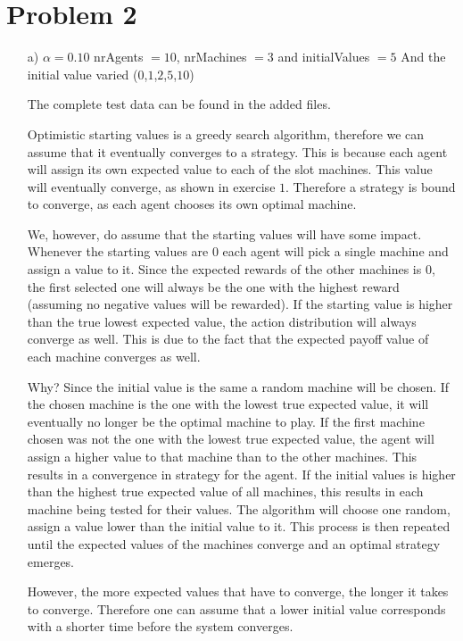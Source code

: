 \documentclass[12pt]{article}
\begin{document}
\section*{Problem 2}
\begin{enumerate}
	\item[a)]
	$\alpha = 0.10$
	nrAgents $= 10$, nrMachines $=3$ and initialValues $=5$
	And the initial value varied ($0$,$1$,$2$,$5$,$10$)

	The complete test data can be found in the added files.

	Optimistic starting values is a greedy search algorithm, therefore we can assume that it eventually converges to a strategy.
	This is because each agent will assign its own expected value to each of the slot machines.
	This value will eventually converge, as shown in exercise $1$.
	Therefore a strategy is bound to converge, as each agent chooses its own optimal machine.

	We, however, do assume that the starting values will have some impact.
	Whenever the starting values are $0$ each agent will pick a single machine and assign a value to it.
	Since the expected rewards of the other machines is $0$, the first selected one will always be the one with the highest reward (assuming no negative values will be rewarded).
	If the starting value is higher than the true lowest expected value, the action distribution will always converge as well.
	This is due to the fact that the expected payoff value of each machine converges as well.

	Why? Since the initial value is the same a random machine will be chosen.
	If the chosen machine is the one with the lowest true expected value, it will eventually no longer be the optimal machine to play.
	If the first machine chosen was not the one with the lowest true expected value, the agent will assign a higher value to that machine than to the other machines.
	This results in a convergence in strategy for the agent.
	If the initial values is higher than the highest true expected value of all machines, this results in each machine being tested for their values.
	The algorithm will choose one random, assign a value lower than the initial value to it.
	This process is then repeated until the expected values of the machines converge and an optimal strategy emerges.

	However, the more expected values that have to converge, the longer it takes to converge.
	Therefore one can assume that a lower initial value corresponds with a shorter time before the system converges.


\end{enumerate}
\end{document}
